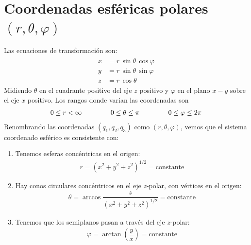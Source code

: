 \section{Coordenadas esféricas polares $(r,\theta, \varphi)$}
Las ecuaciones de transformación son:
\begin{align}
\begin{aligned}
x &= r \, \sin \theta \, \cos \varphi \\
y &= r \, \sin \theta \, \sin \varphi \\
z &= r \, \cos \theta
\end{aligned}
\label{eq:ecuacion_02_038}
\end{align}
Midiendo $\theta$ en el cuadrante positivo del eje $z$ positivo y $\varphi$ en el plano $x-y$ sobre el eje $x$ positivo. Los rangos donde varían las coordenadas son
\begin{align*}
0 \leq r < \infty \hspace{1.5cm} 0 \leq \theta \leq \pi \hspace{1.5cm} 0 \leq \varphi \leq 2 \pi
\end{align*}
Renombrando las coordenadas $(q_{1}, q_{2}, q_{3})$ como $(r, \theta, \varphi)$, vemos que el sistema coordenado esférico es consistente con:
\begin{enumerate}
\item Tenemos esferas concéntricas en el origen:
\begin{align*}
r = (x^{2} + y^{2} + z^{2})^{1/2} =  \text{constante}
\end{align*}
\item Hay conos circulares concéntricos en el eje $z$-polar, con vértices en el origen:
\begin{align*}
\theta = \arccos \dfrac{z}{(x^{2} +y^{2} + z^{2})^{1/2}} = \text{constante}
\end{align*}
\item Tenemos que los semiplanos pasan a través del eje $z$-polar:
\begin{align*}
\varphi = \arctan\left(\dfrac{y}{x} \right) =  \text{constante}
\end{align*}
\end{enumerate}
